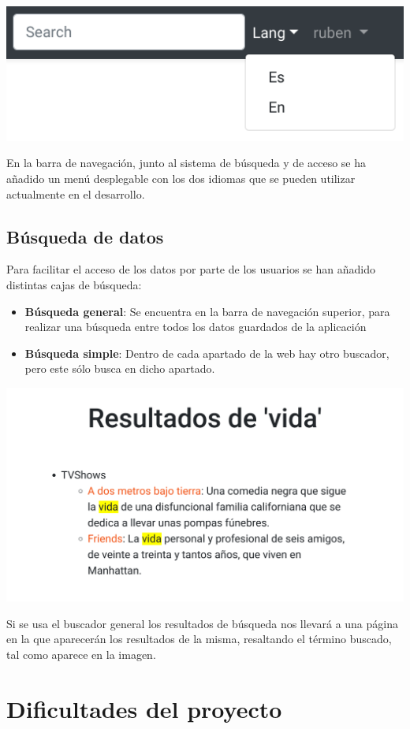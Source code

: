 \documentclass{\ClassPath/viu-tfm-template}
\begin{document}
\begin{center}
    \includegraphics[width=0.5\linewidth]{img/languages.png}
\end{center}

En la barra de navegación, junto al sistema de búsqueda y de acceso se ha añadido un menú desplegable con los dos idiomas que se pueden utilizar actualmente en el desarrollo.


\section{Búsqueda de datos}

Para facilitar el acceso de los datos por parte de los usuarios se han añadido distintas cajas de búsqueda:

\vspace{-1em}
\begin{itemize}
    \item \textbf{Búsqueda general}: Se encuentra en la barra de navegación superior, para realizar una búsqueda entre todos los datos guardados de la aplicación
    \item \textbf{Búsqueda simple}: Dentro de cada apartado de la web hay otro buscador, pero este sólo busca en dicho apartado.
\end{itemize}
\vspace{-1em}

\begin{center}
    \includegraphics[frame,width=0.5\linewidth]{img/buscar.png}
\end{center}

Si se usa el buscador general los resultados de búsqueda nos llevará a una página en la que aparecerán los resultados de la misma, resaltando el término buscado, tal como aparece en la imagen.


\chapter{Dificultades del proyecto}
\end{document}
